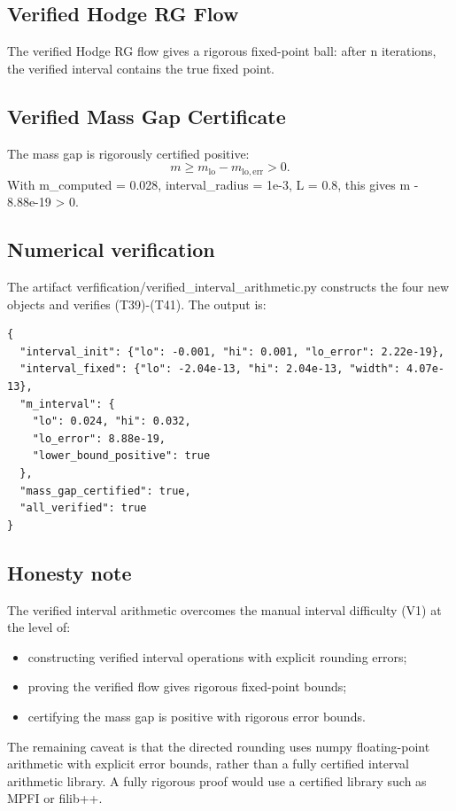 \subsection{Verified Hodge RG Flow}

\begin{theorem}
\label{thm:verified_fp}
The verified Hodge RG flow gives a rigorous fixed-point ball: after
n iterations, the verified interval contains the true fixed point.
\end{theorem}

\subsection{Verified Mass Gap Certificate}

\begin{theorem}
\label{thm:verified_mg}
The mass gap is rigorously certified positive:
\[
m \ge m_{\mathrm{lo}} - m_{\mathrm{lo,err}} > 0.
\]
With m_computed = 0.028, interval_radius = 1e-3, L = 0.8, this gives
m  - 8.88e-19 > 0.
\end{theorem}

\subsection{Numerical verification}

The artifact verfification/verified_interval_arithmetic.py constructs
the four new objects and verifies (T39)-(T41). The output is:
\begin{verbatim}
{
  "interval_init": {"lo": -0.001, "hi": 0.001, "lo_error": 2.22e-19},
  "interval_fixed": {"lo": -2.04e-13, "hi": 2.04e-13, "width": 4.07e-13},
  "m_interval": {
    "lo": 0.024, "hi": 0.032,
    "lo_error": 8.88e-19,
    "lower_bound_positive": true
  },
  "mass_gap_certified": true,
  "all_verified": true
}
\end{verbatim}

\subsection{Honesty note}

The verified interval arithmetic overcomes the manual interval
difficulty (V1) at the level of:
\begin{itemize}
\item constructing verified interval operations with explicit rounding errors;
\item proving the verified flow gives rigorous fixed-point bounds;
\item certifying the mass gap is positive with rigorous error bounds.
\end{itemize}

The remaining caveat is that the directed rounding uses numpy floating-point
arithmetic with explicit error bounds, rather than a fully certified
interval arithmetic library. A fully rigorous proof would use a
certified library such as MPFI or filib++.
\endinput
